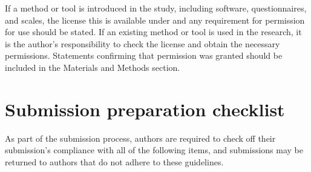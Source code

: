 \documentclass[charis,linguex]{glossa}
\begin{document}
If a method or tool is introduced in the study, including software, questionnaires, and scales, the license this is available under and any requirement for permission for use should be stated. If an existing method or tool is used in the research, it is the author's responsibility to check the license and obtain the necessary permissions. Statements confirming that permission was granted should be included in the Materials and Methods section.

\section{Submission preparation checklist}

As part of the submission process, authors are required to check off their submission's compliance with all of the following items, and submissions may be returned to authors that do not adhere to these guidelines.
\end{document}
